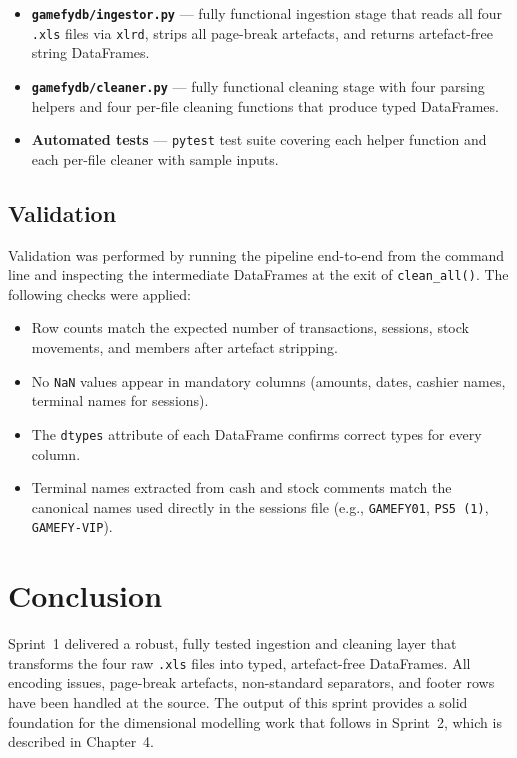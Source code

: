 \begin{itemize}
  \item \textbf{\texttt{gamefydb/ingestor.py}} — fully functional ingestion stage
        that reads all four \texttt{.xls} files via \texttt{xlrd}, strips all
        page-break artefacts, and returns artefact-free string DataFrames.
  \item \textbf{\texttt{gamefydb/cleaner.py}} — fully functional cleaning stage
        with four parsing helpers and four per-file cleaning functions that produce
        typed DataFrames.
  \item \textbf{Automated tests} — \texttt{pytest} test suite covering each helper
        function and each per-file cleaner with sample inputs.
\end{itemize}

\subsection{Validation}

Validation was performed by running the pipeline end-to-end from the command line
and inspecting the intermediate DataFrames at the exit of \texttt{clean\_all()}.
The following checks were applied:

\begin{itemize}[noitemsep]
  \item Row counts match the expected number of transactions, sessions, stock
        movements, and members after artefact stripping.
  \item No \texttt{NaN} values appear in mandatory columns (amounts, dates,
        cashier names, terminal names for sessions).
  \item The \texttt{dtypes} attribute of each DataFrame confirms correct types
        for every column.
  \item Terminal names extracted from cash and stock comments match the canonical
        names used directly in the sessions file (e.g., \texttt{GAMEFY01},
        \texttt{PS5\,(1)}, \texttt{GAMEFY-VIP}).
\end{itemize}

\section{Conclusion}

Sprint~1 delivered a robust, fully tested ingestion and cleaning layer that
transforms the four raw \texttt{.xls} files into typed, artefact-free DataFrames.
All encoding issues, page-break artefacts, non-standard separators, and footer
rows have been handled at the source. The output of this sprint provides a solid
foundation for the dimensional modelling work that follows in Sprint~2, which is
described in Chapter~4.
